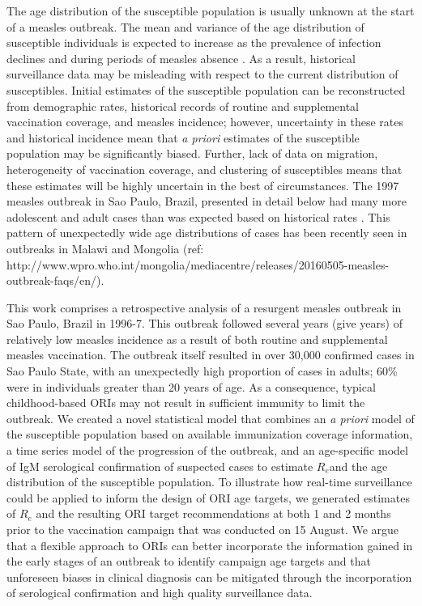 The age distribution of the susceptible population is usually unknown at the start of a measles outbreak. The mean and variance of the age
distribution of susceptible individuals is expected to increase as the prevalence of infection declines \cite{Goodson_2011, Ferrari_2013} and
during periods of measles absence \cite{Durrheim_2014}. As a result, historical surveillance data may be misleading with respect to the current
distribution of susceptibles. Initial estimates of the susceptible population can be reconstructed from demographic rates, historical
records of routine and supplemental vaccination coverage, and measles incidence\cite{Takahashi_2015}; however, uncertainty in these rates and historical incidence mean that \emph{a priori} estimates of the susceptible population may be significantly biased. Further, lack of data on migration, heterogeneity of vaccination coverage, and clustering of susceptibles means that these estimates will be highly uncertain in the best of circumstances. The 1997 measles outbreak in Sao Paulo, Brazil, presented in detail below had many more adolescent and adult cases than
was expected based on historical rates \cite{Camargo_2000}. This pattern of unexpectedly wide age distributions of cases has been recently seen in
outbreaks in Malawi \cite{Minetti_2013} and Mongolia (ref: http://www.wpro.who.int/mongolia/mediacentre/releases/20160505-measles-outbreak-faqs/en/).

This work comprises a retrospective analysis of a resurgent measles outbreak in Sao Paulo, Brazil in 1996-7. This outbreak followed several years (give years) of relatively low measles incidence as a result of both routine and supplemental measles vaccination. The outbreak itself resulted in over 30,000 confirmed cases in Sao Paulo State, with an unexpectedly high proportion of cases in adults; 60\% were in individuals greater than 20
years of age. As a consequence, typical childhood-based ORIs may not result in sufficient immunity to limit the outbreak. We created a novel statistical model that combines an \emph{a priori} model of the susceptible population based on available immunization coverage information, a time series model of the progression of the outbreak, and an age-specific model of IgM serological confirmation of suspected cases to estimate \(R_{e}\)and the age distribution of the susceptible population. To illustrate how real-time surveillance could be applied to inform the design of ORI age targets, we generated estimates of \(R_{e}\) and the resulting ORI target recommendations at both 1 and 2 months prior to the vaccination campaign that was conducted on 15 August. We argue that a flexible approach to ORIs can better incorporate the information gained in the early stages of an
outbreak to identify campaign age targets and that unforeseen biases in clinical diagnosis can be mitigated through the incorporation of
serological confirmation and high quality surveillance data.